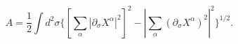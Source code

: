 \begin{equation}
\label{adiri}
A=\frac{1}{2}\int d^2\sigma \{[\sum_{\alpha}|\partial_{\sigma}X^{\alpha}|^2]^2-|\sum_{\alpha}(\partial_{\sigma}X^{\alpha})^2|^2\}^{1/2}.
\end{equation}

